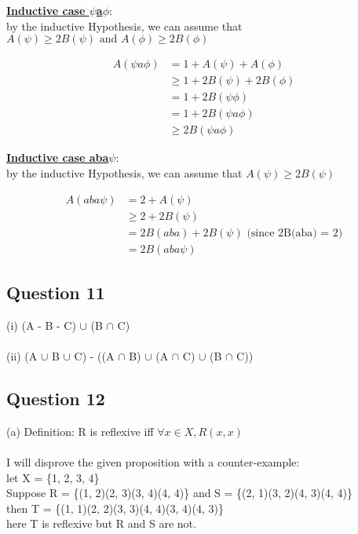 \documentclass[11pt]{article}
\begin{document}
{{{\noindent
\underline{\textbf{Inductive case $\psi$a$\phi$}}: \\
by the inductive Hypothesis, we can assume that
$A(\psi) \geq 2B(\psi) \text{ and } A(\phi) \geq 2B(\phi)$

\begin{align*}
    A(\psi a \phi) &= 1 + A(\psi) + A(\phi) \\
    &\geq 1 + 2B(\psi) + 2B(\phi) \\
    &= 1 + 2B(\psi \phi) \\
    &= 1 + 2B(\psi a \phi) \\
    &\geq 2B(\psi a \phi)
\end{align*}

\noindent
\underline{\textbf{Inductive case aba$\psi$}}: \\
by the inductive Hypothesis, we can assume that
$A(\psi) \geq 2B(\psi)$

\begin{align*}
    A(aba \psi) &= 2 + A(\psi) \\
    &\geq 2 + 2B(\psi) \\
    &= 2B(aba) + 2B(\psi) \text{ (since 2B(aba) = 2)} \\
    &= 2B(aba\psi)
\end{align*}

\subsection*{Question 11}
(i) (A - B - C) $\cup$ (B $\cap$ C) \\ \\
(ii) (A $\cup$ B $\cup$ C) - ((A $\cap$ B) $\cup$ (A $\cap$ C) $\cup$ (B $\cap$ C))

\subsection*{Question 12}
(a) Definition: R is reflexive iff $\forall x \in X, R(x, x)$ \\ \\
%
I will disprove the given proposition with a counter-example: \\
let X = \{1, 2, 3, 4\} \\
Suppose R = \{(1, 2)(2, 3)(3, 4)(4, 4)\} and S = \{(2, 1)(3, 2)(4, 3)(4, 4)\} \\
then T = \{(1, 1)(2, 2)(3, 3)(4, 4)(3, 4)(4, 3)\} \\
here T is reflexive but R and S are not.

}}}
\end{document}
